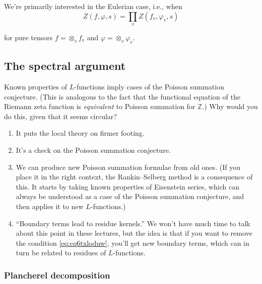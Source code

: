 \documentclass[reqno]{amsart} 
\numberwithin{theorem}{section}
\numberwithin{equation}{section}
\numberwithin{exercise}{section}
\begin{document}
We're primarily interested in the Eulerian case, i.e., when
\begin{equation*}
  Z(f, \varphi, s) = \prod_v Z(f_v, \varphi_v, s)
\end{equation*}

for pure tensors $f = \otimes_v f_v$ and $\varphi = \otimes_v \varphi_v$.

\subsection{The spectral argument}

Known properties of $L$-functions imply cases of the Poisson summation conjecture.  (This is analogous to the fact that the functional equation of the Riemann zeta function is \emph{equivalent} to Poisson summation for $\mathbb{Z}$.)  Why would you do this, given that it seems circular?
\begin{enumerate}
\item It puts the local theory on firmer footing.
\item It's a check on the Poisson summation conjecture.
\item We can produce new Poisson summation formulae from old ones.  (If you place it in the right context, the Rankin--Selberg method is a consequence of this.  It starts by taking known properties of Eisenstein series, which can always be understood as a case of the Poisson summation conjecture, and then applies it to new $L$-functions.)
\item ``Boundary terms lead to residue kernels.''  We won't have much time to talk about this point in these lectures, but the idea is that if you want to remove the condition \eqref{eq:cq6txloduw}, you'll get new boundary terms, which can in turn be related to residues of $L$-functions.
\end{enumerate}

\subsubsection{Plancherel decomposition}
\end{document}
